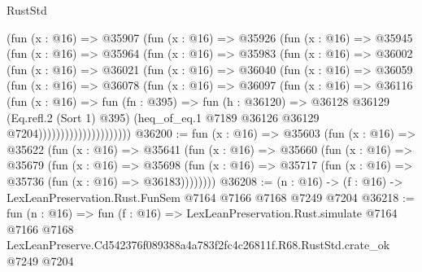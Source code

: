\begin{lexlean}{RustStd}
\begin{coremodule}
                  (fun (x : @16) =>
                  @35907
                    (fun (x : @16) =>
                    @35926
                      (fun (x : @16) =>
                      @35945
                        (fun (x : @16) =>
                        @35964
                          (fun (x : @16) =>
                          @35983
                            (fun (x : @16) =>
                            @36002
                              (fun (x : @16) =>
                              @36021
                                (fun (x : @16) =>
                                @36040
                                  (fun (x : @16) =>
                                  @36059
                                    (fun (x : @16) =>
                                    @36078
                                      (fun (x : @16) =>
                                      @36097
                                        (fun (x : @16) =>
                                        @36116
                                          (fun (x : @16) =>
                                          fun (fn : @395) =>
                                          fun (h : @36120) =>
                                          @36128
                                            @36129
                                            (Eq.refl.{2} (Sort 1) @395)
                                            (heq_of_eq.{1}
                                              @7189
                                              @36126
                                              @36129
                                              @7204)))))))))))))))))))))
@36200 := fun (x : @16) =>
  @35603
    (fun (x : @16) =>
    @35622
      (fun (x : @16) =>
      @35641
        (fun (x : @16) =>
        @35660
          (fun (x : @16) =>
          @35679
            (fun (x : @16) =>
            @35698
              (fun (x : @16) => @35717 (fun (x : @16) => @35736 (fun (x : @16) => @36183))))))))
@36208 := (n : @16) -> (f : @16) -> LexLeanPreservation.Rust.FunSem @7164 @7166 @7168 @7249 @7204
@36218 := fun (n : @16) =>
  fun (f : @16) =>
  LexLeanPreservation.Rust.simulate
    @7164
    @7166
    @7168
    LexLeanPreserve.Cd542376f089388a4a783f2fc4c26811f.R68.RustStd.crate_ok
    @7249
    @7204
\end{coremodule}
\end{lexlean}
